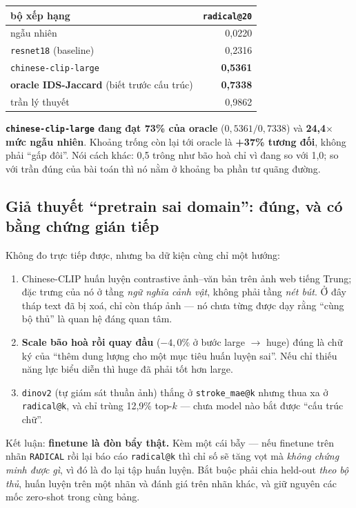 \documentclass[11pt,a4paper]{article}
\newcommand{\code}[1]{\texttt{#1}}
\begin{document}
\begin{center}
\begin{tabular}{lr}
\toprule
bộ xếp hạng & \code{radical@20} \\
\midrule
ngẫu nhiên & 0,0220 \\
\code{resnet18} (baseline) & 0,2316 \\
\code{chinese-clip-large} & \textbf{0,5361} \\
\textbf{oracle IDS-Jaccard} (biết trước cấu trúc) & \textbf{0,7338} \\
trần lý thuyết & 0,9862 \\
\bottomrule
\end{tabular}
\end{center}

\textbf{\code{chinese-clip-large} đang đạt 73\% của oracle} ($0{,}5361/0{,}7338$) và
\textbf{24,4$\times$ mức ngẫu nhiên}. Khoảng trống còn lại tới oracle là \textbf{+37\% tương đối},
không phải ``gấp đôi''. Nói cách khác: 0,5 trông như bão hoà chỉ vì đang so với 1,0; so với trần
đúng của bài toán thì nó nằm ở khoảng ba phần tư quãng đường.

\subsection{Giả thuyết ``pretrain sai domain'': đúng, và có bằng chứng gián tiếp}

Không đo trực tiếp được, nhưng ba dữ kiện cùng chỉ một hướng:

\begin{enumerate}
  \item Chinese-CLIP huấn luyện contrastive ảnh--văn bản trên ảnh web tiếng Trung; đặc trưng của nó
        ở tầng \emph{ngữ nghĩa cảnh vật}, không phải tầng \emph{nét bút}. Ở đây tháp text đã bị xoá,
        chỉ còn tháp ảnh --- nó chưa từng được dạy rằng ``cùng bộ thủ'' là quan hệ đáng quan tâm.
  \item \textbf{Scale bão hoà rồi quay đầu} ($-4{,}0\%$ ở bước large $\to$ huge) đúng là chữ ký của
        ``thêm dung lượng cho một mục tiêu huấn luyện sai''. Nếu chỉ thiếu năng lực biểu diễn thì
        huge đã phải tốt hơn large.
  \item \code{dinov2} (tự giám sát thuần ảnh) thắng ở \code{stroke\_mae@k} nhưng thua xa ở
        \code{radical@k}, và chỉ trùng 12,9\% top-$k$ --- chưa model nào bắt được ``cấu trúc chữ''.
\end{enumerate}

Kết luận: \textbf{finetune là đòn bẩy thật.} Kèm một cái bẫy --- nếu finetune trên nhãn
\code{RADICAL} rồi lại báo cáo \code{radical@k} thì chỉ số sẽ tăng vọt mà \emph{không chứng minh
được gì}, vì đó là đo lại tập huấn luyện. Bắt buộc phải chia held-out \emph{theo bộ thủ}, huấn
luyện trên một nhãn và đánh giá trên nhãn khác, và giữ nguyên các mốc zero-shot trong cùng bảng.
\end{document}

